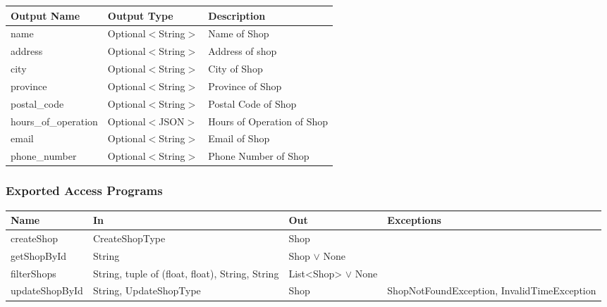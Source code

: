 \documentclass[12pt, titlepage]{article}
\begin{document}
\begin{table}[H]
	\begin{tabular}{|p{}|p{}|p{}|}
		\hline
		\textbf{Output Name} & \textbf{Output Type} & \textbf{Description}       \\
		\hline
		name                 & Optional$<$String$>$ & Name of Shop               \\
		\hline
		address              & Optional$<$String$>$ & Address of shop            \\
		\hline
		city                 & Optional$<$String$>$ & City of Shop               \\
		\hline
		province             & Optional$<$String$>$ & Province of Shop           \\
		\hline
		postal\_code         & Optional$<$String$>$ & Postal Code of Shop        \\
		\hline
		hours\_of\_operation & Optional$<$JSON$>$   & Hours of Operation of Shop \\
		\hline
		email                & Optional$<$String$>$ & Email of Shop              \\
		\hline
		phone\_number        & Optional$<$String$>$ & Phone Number of Shop       \\
		\hline
	\end{tabular}
\end{table}

\subsubsection{Exported Access Programs}

\begin{center}
	\begin{adjustbox}{width=\textwidth}
		\begin{tabular}{llll}
			\hline
			\textbf{Name}  & \textbf{In}                                     & \textbf{Out}           & \textbf{Exceptions}                         \\
			\hline
			createShop     & CreateShopType                                  & Shop                   & ~                                           \\
			getShopById    & String                                          & Shop $\lor$ None       & ~                                           \\
			filterShops    & String, tuple of (float, float), String, String & List<Shop> $\lor$ None & ~                                           \\
			updateShopById & String, UpdateShopType                          & Shop                   & ShopNotFoundException, InvalidTimeException \\
			\hline
		\end{tabular}
	\end{adjustbox}
\end{center}
\end{document}
